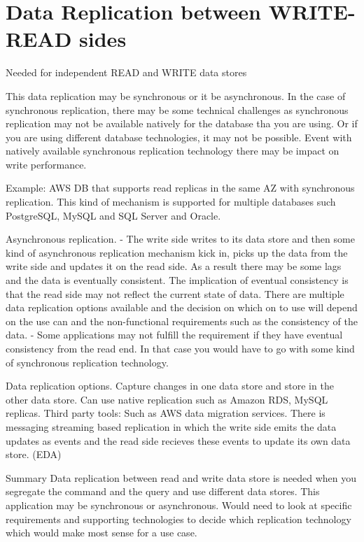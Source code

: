 \section{Data Replication between WRITE-READ sides}
Needed for independent READ and WRITE data stores

This data replication may be synchronous or it be asynchronous.
In the case of synchronous replication, there may be some technical challenges as synchronous replication may not be available natively for the database tha you are using.
Or if you are using different database technologies, it may not be possible.
Event with natively available synchronous replication technology there may be impact on write performance.

Example: AWS DB that supports read replicas in the same AZ with synchronous replication.
This kind of mechanism is supported for multiple databases such PostgreSQL, MySQL and SQL Server and Oracle.

Asynchronous replication.
- The write side writes to its data store and then some kind of asynchronous replication mechanism kick in, picks up the data from the write side and updates it on the read side.
As a result there may be some lags and the data is eventually consistent.
The implication of eventual consistency is that the read side may not reflect the current state of data.
There are multiple data replication options available and the decision on which on to use will depend on the use can and the non-functional requirements such as the consistency of the data.
- Some applications may not fulfill the requirement if they have eventual consistency from the read end.
In that case you would have to go with some kind of synchronous replication technology.

Data replication options.
Capture changes in one data store and store in the other data store.
Can use native replication such as Amazon RDS, MySQL replicas.
Third party tools: Such as AWS data migration services.
There is messaging streaming based replication in which the write side emits the data updates as events and the read side recieves these events to update its own data store. (EDA)

Summary
Data replication between read and write data store is needed when you segregate the command and the query and use different data stores.
This application may be synchronous or asynchronous.
Would need to look at specific requirements and supporting technologies to decide which replication technology which would make most sense for a use case.

